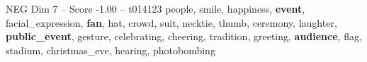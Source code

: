 \begin{textsample}{NEG Dim 7 – Score -1.00 – t014123}  \label{ex:f7_neg_007}
people, smile, happiness, \textbf{event}, facial\_expression, \textbf{fan}, hat, crowd, suit, necktie, thumb, ceremony, laughter, \textbf{public\_event}, gesture, celebrating, cheering, tradition, greeting, \textbf{audience}, flag, stadium, christmas\_eve, hearing, photobombing

\end{textsample}
